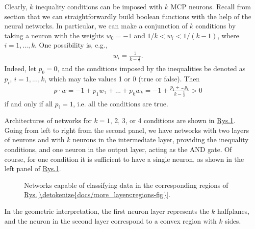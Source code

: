 \documentclass[a4paper,12pt,polish]{jupyterBook}
\let\sphinxpxdimen\pdfpxdimen\else\newdimen\sphinxpxdimen
\begin{document}
\sphinxAtStartPar
Clearly, \(k\) inequality conditions can be imposed with \(k\) MCP neurons.
Recall from section {\hyperref[\detokenize{docs/mcp:bool-sec}]{}} that we can straightforwardly build boolean functions with the help of the neural networks. In particular, we can make a conjunction of \(k\) conditions by taking a neuron with the weights \(w_0=-1\) and \(1/k < w_i < 1/(k-1)\), where \(i=1,\dots,k\). One possibility is, e.g.,
\begin{equation*}
\begin{split}w_i=\frac{1}{k-\frac{1}{2}}.\end{split}
\end{equation*}
\sphinxAtStartPar
Indeed, let \(p_0=0\), and the conditions imposed by the inequalities be denoted as \(p_i\), \(i=1,\dots,k\), which may take values 1 or 0 (true or false). Then
\begin{equation*}
\begin{split}p \cdot w =-1 + p_1 w_1 + \dots + p_k w_k = -1+\frac{p_1+\dots p_k}{k-\frac{1}{2}} > 0\end{split}
\end{equation*}
\sphinxAtStartPar
if and only if all \(p_i=1\), i.e. all the conditions are true.

\sphinxAtStartPar
Architectures of networks for \(k=1\), 2, 3, or 4 conditions are shown in \hyperref[\detokenize{docs/more_layers:nfn-fig}]{Rys.\@ \ref{\detokenize{docs/more_layers:nfn-fig}}}. Going from left to right from the second panel, we have networks with two layers of neurons and with \(k\) neurons in the intermediate layer, providing the inequality conditions, and one neuron in the output layer, acting as the AND gate. Of course, for one condition it is sufficient to have a single neuron, as shown in the left panel of \hyperref[\detokenize{docs/more_layers:nfn-fig}]{Rys.\@ \ref{\detokenize{docs/more_layers:nfn-fig}}}.

\begin{figure}[htbp]
\centering
\capstart

\noindent\sphinxincludegraphics[width=820\sphinxpxdimen]{{nf1-4}.png}
\caption{Networks capable of classifying data in the corresponding regions of \hyperref[\detokenize{docs/more_layers:regions-fig}]{Rys.\@ \ref{\detokenize{docs/more_layers:regions-fig}}}.}\label{\detokenize{docs/more_layers:nfn-fig}}\end{figure}

\sphinxAtStartPar
In the geometric interpretation, the first neuron layer represents the \(k\) half\sphinxhyphen{}planes, and the neuron in the second layer correspond to a convex region with \(k\) sides.
\end{document}
